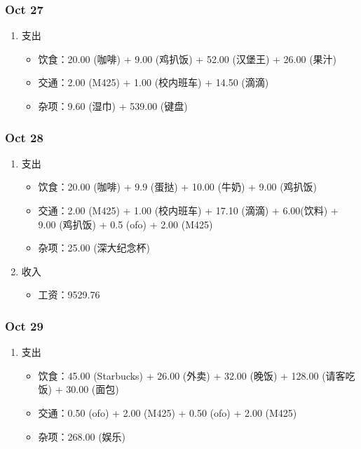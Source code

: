 \documentclass[11pt]{article}
\begin{document}
\subsubsection{Oct 27}
\label{sec:orgheadline27}
\begin{enumerate}
\item 支出
\begin{itemize}
\item 饮食：20.00 (咖啡) + 9.00 (鸡扒饭) + 52.00 (汉堡王) + 26.00 (果汁)
\item 交通：2.00 (M425) + 1.00 (校内班车) + 14.50 (滴滴)
\item 杂项：9.60 (湿巾) + 539.00 (键盘)
\end{itemize}
\end{enumerate}
\subsubsection{Oct 28}
\label{sec:orgheadline28}
\begin{enumerate}
\item 支出
\begin{itemize}
\item 饮食：20.00 (咖啡) + 9.9 (蛋挞) + 10.00 (牛奶) + 9.00 (鸡扒饭)
\item 交通：2.00 (M425) + 1.00 (校内班车) + 17.10 (滴滴) + 6.00(饮料) + 9.00 (鸡扒饭) + 0.5 (ofo) + 2.00 (M425)
\item 杂项：25.00 (深大纪念杯)
\end{itemize}
\item 收入
\begin{itemize}
\item 工资：9529.76
\end{itemize}
\end{enumerate}
\subsubsection{Oct 29}
\label{sec:orgheadline29}
\begin{enumerate}
\item 支出
\begin{itemize}
\item 饮食：45.00 (Starbucks) + 26.00 (外卖) + 32.00 (晚饭) + 128.00 (请客吃饭) + 30.00 (面包)
\item 交通：0.50 (ofo) + 2.00 (M425) + 0.50 (ofo) + 2.00 (M425)
\item 杂项：268.00 (娱乐)
\end{itemize}
\end{enumerate}
\end{document}

